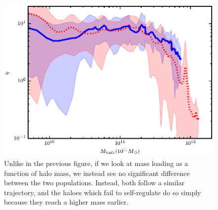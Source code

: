 \begin{figure}
    \includegraphics[width=\columnwidth]{figures3/massloading_halo.eps}
    \caption[Mass loading as a function of halo mass in MUGS2]{Unlike in the
    previous figure, if we look at mass loading as a function of halo mass, we
    instead see no significant difference between the two populations.  Instead,
    both follow a similar trajectory, and the haloes which fail to self-regulate
    do so simply because they reach a higher mass earlier.}
    \label{massloading_halo}
\end{figure}

